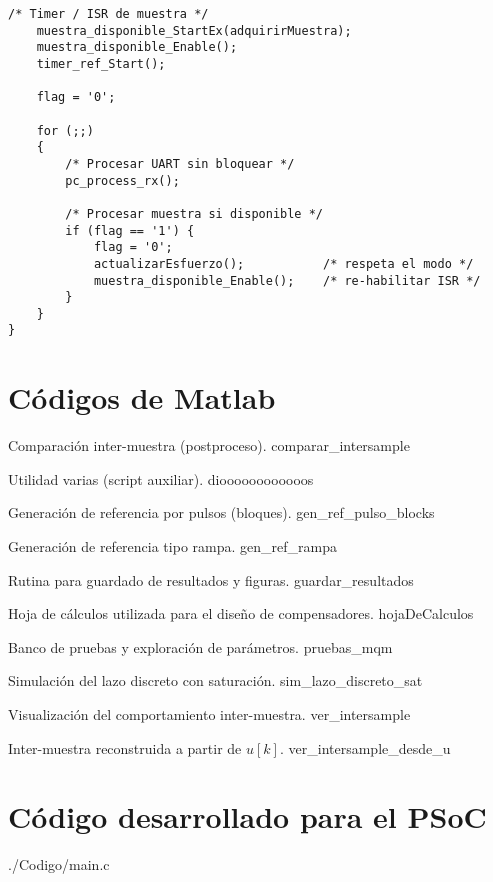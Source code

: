 \begin{lstlisting}[style=cstyle,
	caption={Código desarrollado para la implementación de los compensadores con el PSoC en lenguaje C.},
	label={c:psoc}
	]
	/* Timer / ISR de muestra */
	muestra_disponible_StartEx(adquirirMuestra);
	muestra_disponible_Enable();
	timer_ref_Start();
	
	flag = '0';
	
	for (;;)
	{
		/* Procesar UART sin bloquear */
		pc_process_rx();
		
		/* Procesar muestra si disponible */
		if (flag == '1') {
			flag = '0';
			actualizarEsfuerzo();           /* respeta el modo */
			muestra_disponible_Enable();    /* re-habilitar ISR */
		}
	}
}

\end{lstlisting}\onecolumn
\appendices
\section{Códigos de Matlab}

\lstlistoflistings

{Comparación inter-muestra (postproceso).}
{comparar_intersample}

{Utilidad varias (script auxiliar).}
{dioooooooooooos}

{Generación de referencia por pulsos (bloques).}
{gen_ref_pulso_blocks}

{Generación de referencia tipo rampa.}
{gen_ref_rampa}

{Rutina para guardado de resultados y figuras.}
{guardar_resultados}

{Hoja de cálculos utilizada para el diseño de compensadores.}
{hojaDeCalculos}

{Banco de pruebas y exploración de parámetros.}
{pruebas_mqm}

{Simulación del lazo discreto con saturación.}
{sim_lazo_discreto_sat}

{Visualización del comportamiento inter-muestra.}
{ver_intersample}

{Inter-muestra reconstruida a partir de $u[k]$.}
{ver_intersample_desde_u}

\section{Código desarrollado para el PSoC}


{./Codigo/main.c}
